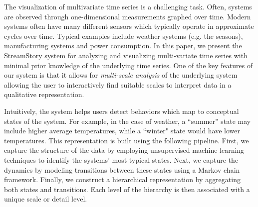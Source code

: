 The visualization of multivariate time series is a challenging task. Often, systems are observed through one-dimensional measurements graphed over time. Modern systems often have many different sensors which 
typically operate in approximate cycles over time. Typical examples include weather systems (e.g. the seasons), manufacturing systems and power consumption. 
%
In this paper, we  present the StreamStory system for analyzing and visualizing multi-variate time series with minimal prior knowledge of the underlying time series. One of the key features of our system is that it allows for  \emph{multi-scale analysis} of the underlying system allowing the user to interactively find suitable scales to interpret  data in a qualitative representation.  

Intuitively, the system helps users detect behaviors which map to conceptual states of the system. For example, in the case of weather, a ``summer'' state may include higher average temperatures, while a ``winter" state would have lower temperatures. 
%
This representation is built using the following pipeline. First, we capture the structure of the data by employing unsupervised machine learning
techniques to identify the systems' most typical states. Next, we capture the
dynamics by modeling transitions between these states using a Markov chain framework.
Finally, we construct a hierarchical representation by aggregating both
states and transitions. Each level of the hierarchy is then associated with a unique
scale or detail level.

